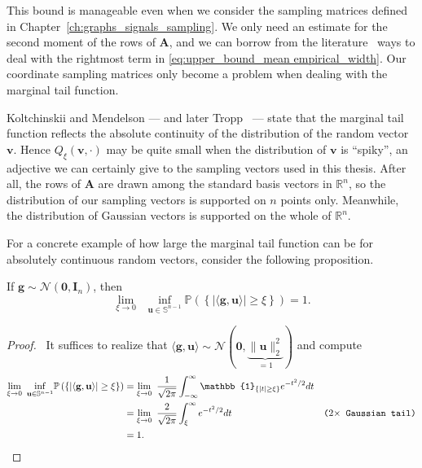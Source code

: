 This bound is manageable even when we consider the sampling matrices defined in Chapter~\ref{ch:graphs_signals_sampling}. We only need an estimate for the second moment of the rows of $\mathbf{A}$, and we can borrow from the literature~\cite{kabanava2015a} ways to deal with the rightmost term in \eqref{eq:upper_bound_mean empirical_width}. Our coordinate sampling matrices only become a problem when dealing with the marginal tail function.

Koltchinskii and Mendelson \cite{koltchinskii2015} --- and later Tropp~\cite{tropp2015a} --- state that the marginal tail function reflects the absolute continuity of the distribution of the random vector $\mathbf{v}$. Hence $Q_{\xi}(\mathbf{v}, \cdot)$ may be quite small when the distribution of $\mathbf{v}$ is ``spiky'', an adjective we can certainly give to the sampling vectors used in this thesis. After all, the rows of $\mathbf{A}$ are drawn among the standard basis vectors in $\mathbb{R}^{n}$, so the distribution of our sampling vectors is supported on $n$ points only. Meanwhile, the distribution of Gaussian vectors is supported on the whole of $\mathbb{R}^{n}$.

For a concrete example of how large the marginal tail function can be for absolutely continuous random vectors, consider the following proposition.

\begin{proposition}\label{prop:inf_gauss_tail}
    If $\mathbf{g} \sim \mathcal{N}(\mathbf{0}, \mathbf{I}_n)$, then
    \begin{equation}
        \underset{\xi \to 0}{\lim} \enspace \underset{\mathbf{u} \in \mathbb{S}^{n-1}}{\inf} \mathbb{P} \left ( \left \{ | \langle \mathbf{g}, \mathbf{u}\rangle | \geq \xi \right \} \right ) = 1.
    \end{equation}
\end{proposition}

\begin{proof}
    \pf\ It suffices to realize that $\langle \mathbf{g}, \mathbf{u} \rangle \sim \mathcal{N}(\mathbf{0}, \underbrace{\|\mathbf{u}\|_{2}^2}_{=1})$ and compute
    \begin{align*}
        \underset{\xi \to 0}{\lim} \enspace \underset{\mathbf{u} \in \mathbb{S}^{n-1}}{\inf} \mathbb{P} \left ( \left \{ | \langle \mathbf{g}, \mathbf{u}\rangle | \geq \xi \right \} \right ) & = \underset{\xi \to 0}{\lim} \enspace \frac{1}{\sqrt{2\pi}}\int_{-\infty}^{\infty} \mathbb{1}_{\{ |t| \geq \xi \}} e^{-t^2/2} dt \\
        & = \underset{\xi \to 0}{\lim} \enspace \frac{2}{\sqrt{2\pi}}\int_{\xi}^{\infty} e^{-t^2/2} dt & \comment{$2\times$ Gaussian tail}\\
        & = 1.
    \end{align*}
    \hfill\qedsymbol
\end{proof}

